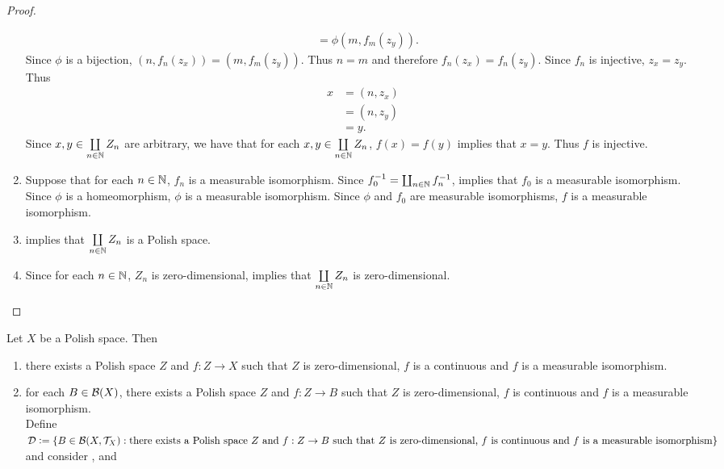 \documentclass{book}
\begin{document}
\begin{proof}
\begin{enumerate}
\begin{align*}
			 	& = \phi(m, f_m(z_y)).
			\end{align*}
			Since $\phi$ is a bijection, $(n, f_n(z_x)) = (m, f_m(z_y))$. Thus $n = m$ and therefore $f_n(z_x) = f_n(z_y)$. Since $f_n$ is injective, $z_x = z_y$. Thus 
			\begin{align*}
				x
				& = (n, z_x) \\
				& = (n, z_y) \\
				& = y.
			\end{align*}
			Since $x, y \in \coprod\limits_{n \in \mathbb{N}} Z_n$ are arbitrary, we have that for each $x, y \in  \coprod\limits_{n \in \mathbb{N}} Z_n$, $f(x) = f(y)$ implies that $x = y$. Thus $f$ is injective.
			\item Suppose that for each $n \in \mathbb{N}$, $f_n$ is a measurable isomorphism. Since $f_0^{-1} = \coprod_{n \in \mathbb{N}} f_n^{-1}$,  implies that $f_0$ is a measurable isomorphism. Since $\phi$ is a homeomorphism, $\phi$ is a measurable isomorphism. Since $\phi$ and $f_0$ are measurable isomorphisms, $f$ is a measurable isomorphism.
			\item {} implies that $\coprod\limits_{n \in \mathbb{N}} Z_n$ is a Polish space.
			\item Since for each $n \in \mathbb{N}$, $Z_n$ is zero-dimensional,  implies that $\coprod\limits_{n \in \mathbb{N}} Z_n$ is zero-dimensional. 
		\end{enumerate}
	\end{proof}


	\begin{ex} 
		Let $X$ be a Polish space. Then
		\begin{enumerate}
			\item there exists a Polish space $Z$ and $f:Z \rightarrow X$ such that $Z$ is zero-dimensional, $f$ is a continuous and $f$ is a measurable isomorphism. \\
			 
			\item for each $B \in \mathcal{B}(X)$, there exists a Polish space $Z$ and $f:Z \rightarrow B$ such that $Z$ is zero-dimensional, $f$ is continuous and $f$ is a measurable isomorphism. \\
			 Define 
			$\mathcal{D} \vcentcolon= \{B \in \mathcal{B}(X, \mathcal{T}_X): \text{there exists a Polish space $Z$ and $f:Z \rightarrow B$ such that $Z$ is zero-dimensional, } \\ \text{$f$ is continuous and $f$ is a measurable isomorphism}\}$ and consider ,  and 
		\end{enumerate}
	\end{ex}
	
\end{document}
